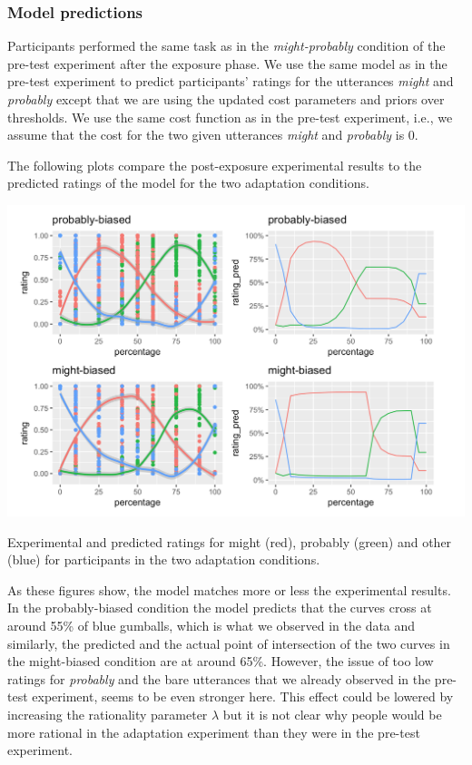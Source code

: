 \documentclass[lucida,biblatex]{sp} %
\begin{document}
\subsubsection{Model predictions}


Participants performed the same task as in the \textit{might-probably} condition of the pre-test experiment after the exposure phase. We use the same model as in the pre-test experiment to predict participants' ratings for the utterances \textit{might} and \textit{probably} except that we are using the updated cost parameters and priors over thresholds. We use the same cost function as in the pre-test experiment, i.e., we assume that the cost for the two given utterances \textit{might} and \textit{probably} is 0.

The following plots compare the post-exposure experimental results to the predicted ratings of the model for the two adaptation conditions.


\begin{center}
\includegraphics[width=\textwidth]{figures/adaptation-results.png}

Experimental and predicted ratings for might (red), probably (green) and other (blue) for participants in the two adaptation conditions.

\vspace{2em}
\end{center}

As these figures show, the model matches more or less the experimental results. In the probably-biased condition the model predicts that the curves cross at around 55\% of blue gumballs, which is what we observed in the data and similarly, the predicted and the actual point of intersection of the two curves in the might-biased condition are at around 65\%. However, the issue of too low ratings for \textit{probably} and the bare utterances that we already observed in the pre-test experiment, seems to be even stronger here. This effect could be lowered by increasing the rationality parameter $\lambda$ but it is not clear why people would be more rational in the adaptation experiment than they were in the pre-test experiment.
\end{document}
